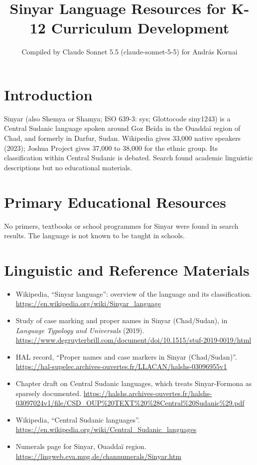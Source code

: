 \documentclass[12pt]{article}
\title{Sinyar Language Resources for K-12 Curriculum Development}
\author{Compiled by Claude Sonnet 5.5 (claude-sonnet-5-5) for Andr\'as Kornai}
\date{}
\begin{document}
\maketitle

\section{Introduction}
Sinyar (also Shemya or Shamya; ISO 639-3: sys; Glottocode siny1243) is a Central Sudanic language spoken around Goz Be\"ida in the Ouadda\"i region of Chad, and formerly in Darfur, Sudan. Wikipedia gives 33,000 native speakers (2023); Joshua Project gives 37,000 to 38,000 for the ethnic group. Its classification within Central Sudanic is debated. Search found academic linguistic descriptions but no educational materials.

\section{Primary Educational Resources}
No primers, textbooks or school programmes for Sinyar were found in search results. The language is not known to be taught in schools.

\section{Linguistic and Reference Materials}
\begin{itemize}
\item Wikipedia, ``Sinyar language'': overview of the language and its classification. \url{https://en.wikipedia.org/wiki/Sinyar_language}
\item Study of case marking and proper names in Sinyar (Chad/Sudan), in \emph{Language Typology and Universals} (2019). \url{https://www.degruyterbrill.com/document/doi/10.1515/stuf-2019-0019/html}
\item HAL record, ``Proper names and case markers in Sinyar (Chad/Sudan)''. \url{https://hal-supelec.archives-ouvertes.fr/LLACAN/halshs-03096955v1}
\item Chapter draft on Central Sudanic languages, which treats Sinyar-Formona as sparsely documented. \url{https://halshs.archives-ouvertes.fr/halshs-03097024v1/file/CSD_OUP%20TEXT%20%28Central%20Sudanic%29.pdf}
\item Wikipedia, ``Central Sudanic languages''. \url{https://en.wikipedia.org/wiki/Central_Sudanic_languages}
\item Numerals page for Sinyar, Ouadda\"i region. \url{https://lingweb.eva.mpg.de/channumerals/Sinyar.htm}
\end{itemize}
\end{document}
